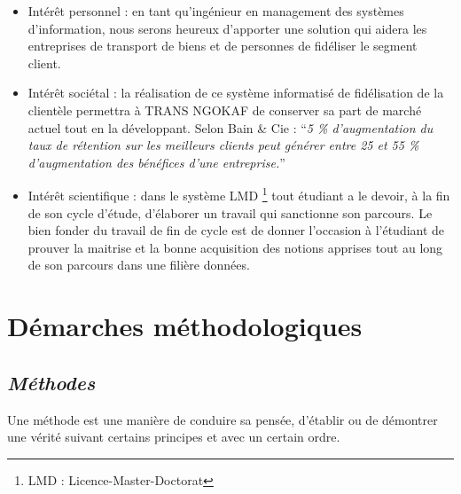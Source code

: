             \begin{itemize}
                \item [\ding{226}] Intérêt personnel : en tant qu’ingénieur en management 
                des systèmes d’information, nous serons heureux d’apporter une solution
                qui aidera les entreprises de transport de biens et de personnes de fidéliser
                le segment client.
                \newline

                \item [\ding{226}] Intérêt sociétal : la réalisation de ce système
                informatisé de fidélisation de la clientèle permettra à TRANS NGOKAF
                de conserver sa part de marché actuel tout en la développant. 
                Selon Bain \& Cie : \enquote{\textit{5 \% d’augmentation du taux de
                rétention sur les meilleurs clients peut générer entre 25 et 55 \%
                d’augmentation des bénéfices d’une entreprise.}} \cite*{Siecdigi}
                \newline

                \item [\ding{226}] Intérêt scientifique : dans le système LMD
                \footnote[1]{LMD : Licence-Master-Doctorat} tout étudiant
                a le devoir, à la fin de son cycle d’étude, d’élaborer un travail qui
                sanctionne son parcours. Le bien fonder du travail de fin de cycle
                est de donner l’occasion à l’étudiant de prouver la maitrise et la bonne acquisition
                des notions apprises tout au long de son parcours dans une filière données.
            \end{itemize}
    \section[Démarches méthodologiques]{Démarches méthodologiques}
        \subsection[Méthodes]{\textit{Méthodes}}
        Une méthode est une manière de conduire sa pensée, d’établir ou de démontrer une
        vérité suivant certains principes et avec un certain ordre.
        \newline

